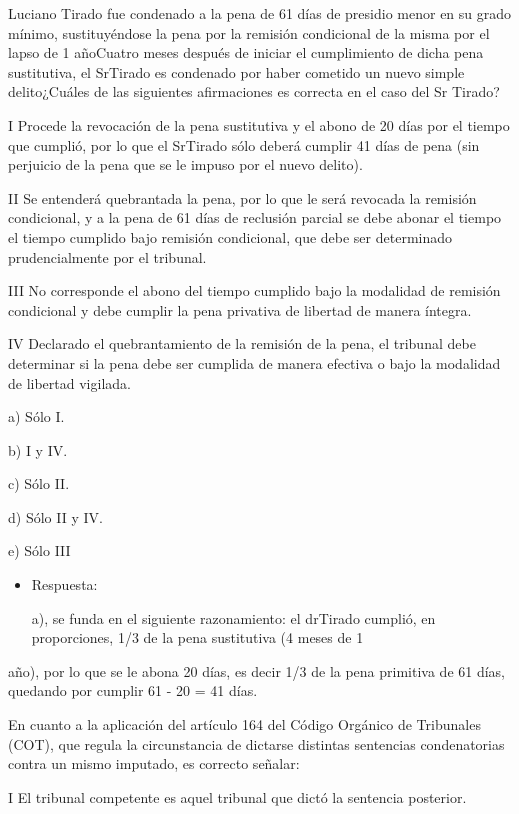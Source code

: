 \documentclass[letterpaper, 11pt]{article}
\begin{document}
Luciano Tirado fue condenado a la pena de 61 días de presidio menor en
su grado mínimo, sustituyéndose la pena por la remisión condicional de
la misma por el lapso de 1 añoCuatro meses después de iniciar el
cumplimiento de dicha pena sustitutiva, el SrTirado es condenado por
haber cometido un nuevo simple delito¿Cuáles de las siguientes
afirmaciones es correcta en el caso del Sr Tirado?

I Procede la revocación de la pena sustitutiva y el abono de 20 días
por el tiempo que cumplió, por lo que el SrTirado sólo deberá cumplir
41 días de pena (sin perjuicio de la pena que se le impuso por el
nuevo delito).



II Se entenderá quebrantada la pena, por lo que le será revocada la
remisión condicional, y a la pena de 61 días de reclusión parcial se
debe abonar el tiempo el tiempo cumplido bajo remisión condicional,
que debe ser determinado prudencialmente por el tribunal.


III No corresponde el abono del tiempo cumplido bajo la modalidad de
remisión condicional y debe cumplir la pena privativa de libertad de
manera íntegra.


IV Declarado el quebrantamiento de la remisión de la pena, el tribunal
debe determinar si la pena debe ser cumplida de manera efectiva o bajo
la modalidad de libertad vigilada.


a) Sólo I.


b) I y IV.



c) Sólo II.



d) Sólo II y IV.



e) Sólo III


\begin{itemize}
\item Respuesta:

a), se funda en el siguiente razonamiento: el drTirado cumplió, en
proporciones, 1/3 de la pena sustitutiva (4 meses de 1
\end{itemize}
año), por lo que se le abona 20 días, es decir 1/3 de la pena
  primitiva de 61 días, quedando por cumplir 61 - 20 = 41 días.


En cuanto a la aplicación del artículo 164 del Código Orgánico de
Tribunales (COT), que regula la circunstancia de dictarse distintas
sentencias condenatorias contra un mismo imputado, es correcto
señalar:


I El tribunal competente es aquel tribunal que dictó la sentencia
posterior.
\end{document}
